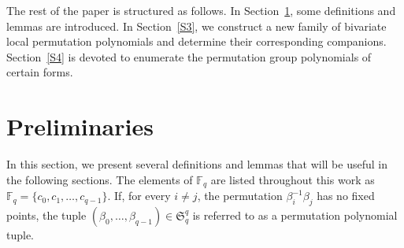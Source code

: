 \documentclass[11pt]{amsart}
\theoremstyle{plain}
\numberwithin{equation}{section}
\def\F{{\mathbb F}}
\begin{document}
The rest of the paper is structured as follows. In Section~\ref{S2}, some definitions and lemmas are introduced. In Section~\ref{S3}, we construct a new family of bivariate local permutation polynomials and determine their corresponding companions. Section~\ref{S4} is devoted to enumerate the permutation group polynomials of certain forms.






\section{Preliminaries}\label{S2}
In this section, we present several definitions and lemmas that will be useful in the following sections. The elements of $\mathbb{F}_q$ are listed throughout this work as $\F_{q} = \{c_0, c_1, \ldots, c_{q-1}\}$. If, for every $i \neq j$, the permutation $\beta_i^{-1} \beta_j$ has no fixed points, the tuple $(\beta_0, \ldots, \beta_{q-1}) \in \mathfrak{S}_q^q$ is referred to as a permutation polynomial tuple.

\end{document}
